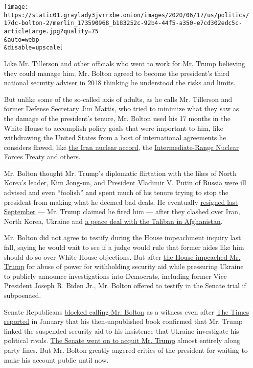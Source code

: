 \texttt{[image: https://static01.graylady3jvrrxbe.onion/images/2020/06/17/us/politics/17dc-bolton-2/merlin\_173590968\_b183252c-92b4-44f5-a350-e7cd302edc5c-articleLarge.jpg?quality=75\\\&auto=webp\\\&disable=upscale]}

Like Mr. Tillerson and other officials who went to work for Mr. Trump
believing they could manage him, Mr. Bolton agreed to become the
president's third national security adviser in 2018 thinking he
understood the risks and limits.

But unlike some of the so-called axis of adults, as he calls Mr.
Tillerson and former Defense Secretary Jim Mattis, who tried to minimize
what they saw as the damage of the president's tenure, Mr. Bolton used
his 17 months in the White House to accomplish policy goals that were
important to him, like withdrawing the United States from a host of
international agreements he considers flawed, like
\href{https://www.nytimes3xbfgragh.onion/2018/05/08/world/middleeast/trump-iran-nuclear-deal.html}{the
Iran nuclear accord}, the
\href{https://www.nytimes3xbfgragh.onion/2019/08/01/world/asia/inf-missile-treaty.html}{Intermediate-Range
Nuclear Forces Treaty} and others.

Mr. Bolton thought Mr. Trump's diplomatic flirtation with the likes of
North Korea's leader, Kim Jong-un, and President Vladimir V. Putin of
Russia were ill advised and even ``foolish'' and spent much of his
tenure trying to stop the president from making what he deemed bad
deals. He eventually
\href{https://www.nytimes3xbfgragh.onion/2019/09/10/us/politics/john-bolton-national-security-adviser-trump.html}{resigned
last September} --- Mr. Trump claimed he fired him --- after they
clashed over Iran, North Korea, Ukraine and
\href{https://www.nytimes3xbfgragh.onion/2019/09/08/world/asia/afghanistan-trump-camp-david-taliban.html}{a
peace deal with the Taliban in Afghanistan}.

Mr. Bolton did not agree to testify during the House impeachment inquiry
last fall, saying he would wait to see if a judge would rule that former
aides like him should do so over White House objections. But after
\href{https://www.nytimes3xbfgragh.onion/2019/12/18/us/politics/trump-impeached.html}{the
House impeached Mr. Trump} for abuse of power for withholding security
aid while pressuring Ukraine to publicly announce investigations into
Democrats, including former Vice President Joseph R. Biden Jr., Mr.
Bolton offered to testify in the Senate trial if subpoenaed.

Senate Republicans
\href{https://www.nytimes3xbfgragh.onion/2020/01/31/us/politics/trump-impeachment-trial.html?action=click\&module=RelatedLinks\&pgtype=Article}{blocked
calling Mr. Bolton} as a witness even after
\href{https://www.nytimes3xbfgragh.onion/2020/01/26/us/politics/trump-bolton-book-ukraine.html}{The
Times reported} in January that his then-unpublished book confirmed that
Mr. Trump linked the suspended security aid to his insistence that
Ukraine investigate his political rivals.
\href{https://www.nytimes3xbfgragh.onion/2020/02/05/us/politics/trump-acquitted-impeachment.html}{The
Senate went on to acquit Mr. Trump} almost entirely along party lines.
But Mr. Bolton greatly angered critics of the president for waiting to
make his account public until now.

